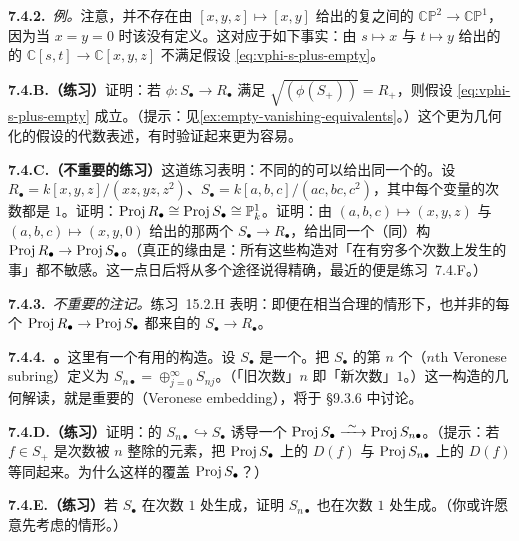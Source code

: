 \textbf{7.4.2.}\ \emph{例。}\quad 注意，并不存在由 $[x,y,z]\mapsto[x,y]$ 给出的复\trManifold{}之间的\trMap{} $\mathbb{CP}^2\to\mathbb{CP}^1$，因为当 $x=y=0$ 时该\trMap{}没有定义。这对应于如下事实：由 $s\mapsto x$ 与 $t\mapsto y$ 给出的\trGradedRing{}的\trMap{} $\mathbb{C}[s,t]\to\mathbb{C}[x,y,z]$ 不满足假设 \eqref{eq:vphi-s-plus-empty}。

\textbf{7.4.B.（练习）}\quad 证明：若 $\phi\colon S_\bullet\to R_\bullet$ 满足 $\sqrt{(\phi(S_+))}=R_+$，则假设 \eqref{eq:vphi-s-plus-empty} 成立。（提示：见\cref{ex:empty-vanishing-equivalents}。）这个更为几何化的假设的代数表述，有时验证起来更为容易。

\textbf{7.4.C.（不重要的练习）}\quad 这道练习表明：不同的\trGradedRing{}的\trMap{}可以给出同一个\trScheme{}的\trMap。设 $R_\bullet=k[x,y,z]/(xz,yz,z^2)$、$S_\bullet=k[a,b,c]/(ac,bc,c^2)$，其中每个变量的次数都是 $1$。证明：$\operatorname{Proj} R_\bullet\cong\operatorname{Proj} S_\bullet\cong\mathbb{P}^1_k$。证明：由 $(a,b,c)\mapsto(x,y,z)$ 与 $(a,b,c)\mapsto(x,y,0)$ 给出的那两个\trMap{} $S_\bullet\to R_\bullet$，给出同一个（同）构 $\operatorname{Proj} R_\bullet\to\operatorname{Proj} S_\bullet$。（真正的缘由是：所有这些构造对「在有穷多个次数上发生的事」都不敏感。这一点日后将从多个途径说得精确，最近的便是练习~7.4.F。）

\textbf{7.4.3.}\ \emph{不重要的注记。}\quad \mbox{练习~15.2.H} 表明：即便在相当合理的情形下，也并非\trScheme{}的每个\trMorphism{} $\operatorname{Proj} R_\bullet\to\operatorname{Proj} S_\bullet$ 都来自\trGradedRing{}的\trMap{} $S_\bullet\to R_\bullet$。

\textbf{7.4.4.\ \trVeroneseSubring{}。}\quad 这里有一个有用的构造。设 $S_\bullet$ 是一个\trFinitelyGenerated\trGradedRing。把 $S_\bullet$ 的第 $n$ 个\textbf{\trVeroneseSubring{}}（$n$th Veronese subring）定义为 $S_{n\bullet}=\oplus_{j=0}^{\infty}S_{nj}$。（「旧次数」$n$ 即「新次数」$1$。）这一构造的几何解读，就是重要的\emph{\trVeroneseEmbedding{}}（Veronese embedding），将于 \S9.3.6 中讨论。

\textbf{7.4.D.（练习）}\quad 证明：\trGradedRing{}的\trMap{} $S_{n\bullet}\hookrightarrow S_\bullet$ 诱导一个\emph{\trIsomorphism} $\operatorname{Proj} S_\bullet\mathrel{\xrightarrow{\ \sim\ }}\operatorname{Proj} S_{n\bullet}$。（提示：若 $f\in S_+$ 是次数被 $n$ 整除的\trHomogeneous{}元素，把 $\operatorname{Proj} S_\bullet$ 上的 $D(f)$ 与 $\operatorname{Proj} S_{n\bullet}$ 上的 $D(f)$ 等同起来。为什么这样的\trDistinguishedOpen{}覆盖 $\operatorname{Proj} S_\bullet$？）

\textbf{7.4.E.（练习）}\quad 若 $S_\bullet$ 在次数 $1$ 处生成，证明 $S_{n\bullet}$ 也在次数 $1$ 处生成。（你或许愿意先考虑\trPolynomialRing{}的情形。）

